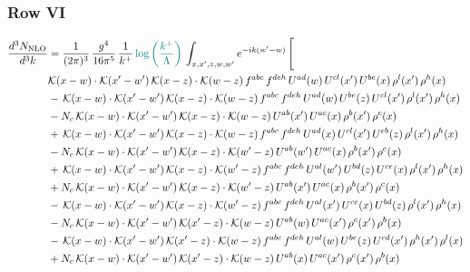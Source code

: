 \documentclass[9pt]{article}
\numberwithin{equation}{section}
\begin{document}
\subsubsection{Row VI}
\begin{align}
\frac{d^{3}N_{\mathrm{NLO}}}{d^{3}k} & = \frac{1}{(2\pi)^{3}}\,\frac{g^{4}}{16\pi^{5}}\,\frac{1}{k^{+}}\,{\color{teal}\log{\left(\frac{k^{+}}{\Lambda}\right)}}\,\int_{x,x',z,w,w'}e^{-ik(w'-w)}\,\Bigg[\notag\\ & \mathcal{K}(x-w)\cdot\mathcal{K}(x'-w')\,\mathcal{K}(x-z)\cdot\mathcal{K}(w-z)\,f^{abc}\,f^{deh}\,U^{ad}(w)\,U^{cl}(x')\,U^{be}(x)\,\rho^{l}(x')\,\rho^{h}(x)\notag\\
& -\,\mathcal{K}(x-w)\cdot\mathcal{K}(x'-w')\,\mathcal{K}(x-z)\cdot\mathcal{K}(w-z)\,f^{abc}\,f^{deh}\,U^{ad}(w)\,U^{be}(z)\,U^{cl}(x')\,\rho^{l}(x')\,\rho^{h}(x)\notag\\
& -N_{c}\,\mathcal{K}(x-w)\cdot\mathcal{K}(x'-w')\,\mathcal{K}(x-z)\cdot\mathcal{K}(w-z)\,U^{ab}(x')\,U^{ac}(x)\,\rho^{b}(x')\,\rho^{c}(x)\notag\\
& +\,\mathcal{K}(x-w)\cdot\mathcal{K}(x'-w')\,\mathcal{K}(x-z)\cdot\mathcal{K}(w-z)\,f^{abc}\,f^{deh}\,U^{ad}(x)\,U^{cl}(x')\,U^{eb}(z)\,\rho^{l}(x')\,\rho^{h}(x)\notag\\
& -N_{c}\,\mathcal{K}(x-w)\cdot\mathcal{K}(x'-w')\,\mathcal{K}(x-z)\cdot\mathcal{K}(w'-z)\,U^{ab}(w')\,U^{ac}(x)\,\rho^{b}(x')\,\rho^{c}(x)\notag\\
& +\,\mathcal{K}(x-w)\cdot\mathcal{K}(x'-w')\,\mathcal{K}(x-z)\cdot\mathcal{K}(w'-z)\,f^{abc}\,f^{deh}\,U^{al}(w')\,U^{bd}(z)\,U^{ce}(x)\,\rho^{l}(x')\,\rho^{h}(x)\notag\\
& +N_{c}\,\mathcal{K}(x-w)\cdot\mathcal{K}(x'-w')\,\mathcal{K}(x-z)\cdot\mathcal{K}(w'-z)\,U^{ab}(x')\,U^{ac}(x)\,\rho^{b}(x')\,\rho^{c}(x)\notag\\
& -\,\mathcal{K}(x-w)\cdot\mathcal{K}(x'-w')\,\mathcal{K}(x-z)\cdot\mathcal{K}(w'-z)\,f^{abc}\,f^{deh}\,U^{al}(x')\,U^{ce}(x)\,U^{bd}(z)\,\rho^{l}(x')\,\rho^{h}(x)\notag\\
& -N_{c}\,\mathcal{K}(x-w)\cdot\mathcal{K}(x'-w')\,\mathcal{K}(x'-z)\cdot\mathcal{K}(w-z)\,U^{ab}(w)\,U^{ac}(x')\,\rho^{c}(x')\,\rho^{b}(x)\notag\\
& -\,\mathcal{K}(x-w)\cdot\mathcal{K}(x'-w')\,\mathcal{K}(x'-z)\cdot\mathcal{K}(w-z)\,f^{abc}\,f^{deh}\,U^{al}(w)\,U^{be}(z)\,U^{cd}(x')\,\rho^{h}(x')\,\rho^{l}(x)\notag\\
& +N_{c}\,\mathcal{K}(x-w)\cdot\mathcal{K}(x'-w')\,\mathcal{K}(x'-z)\cdot\mathcal{K}(w-z)\,U^{ab}(x)\,U^{ac}(x')\,\rho^{c}(x')\,\rho^{b}(x)\notag\\

\end{align}
\end{document}
